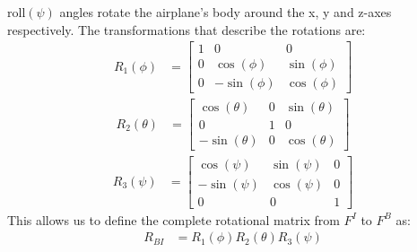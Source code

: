 \documentclass[twocolumn,showpacs,
    nofootinbib,aps,superscriptaddress,
    eqsecnum,prd,showkeys,10pt,floatfix]{revtex4}
\begin{document}
roll$(\psi)$ angles rotate the airplane's body around the x, y and z-axes
respectively. The transformations that describe the rotations are:
\begin{align}
    R_1(\phi) & = \begin{bmatrix}
                      1 & 0           & 0          \\
                      0 & \cos(\phi)  & \sin(\phi) \\
                      0 & -\sin(\phi) & \cos(\phi)
                  \end{bmatrix}
    \label{PhiEulerRotation}
\end{align}
\begin{align}
    R_2(\theta) & = \begin{bmatrix}
                        \cos(\theta)  & 0 & \sin(\theta) \\
                        0             & 1 & 0            \\
                        -\sin(\theta) & 0 & \cos(\theta)
                    \end{bmatrix}
    \label{thetaEulerRotation}
\end{align}
\begin{align}
    R_3(\psi) & = \begin{bmatrix}
                      \cos(\psi)  & \sin(\psi) & 0 \\
                      -\sin(\psi) & \cos(\psi) & 0 \\
                      0           & 0          & 1
                  \end{bmatrix}
    \label{PsiEulerRotation}
\end{align}
This allows us to define the complete rotational matrix from $F^I$ to $F^B$ as:
\begin{align}
    R_{BI} & =R_1(\phi)R_2(\theta)R_3(\psi)
    \label{BodyToEarthRotationMatrix}
\end{align}

\end{document}
